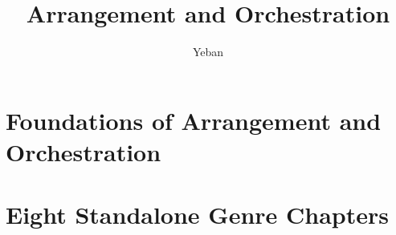 \documentclass[11pt]{book}
\title{Arrangement and Orchestration}
\author{Yeban}
\date{}
\begin{document}
\maketitle
\tableofcontents

\part{Foundations of Arrangement and Orchestration}










\part{Eight Standalone Genre Chapters}









\printindex
\end{document}

